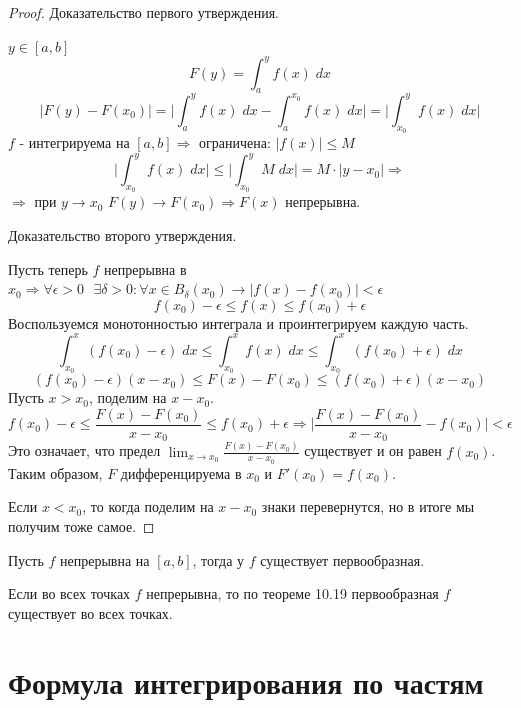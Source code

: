     \begin{proof}
    	Доказательство первого утверждения.
    	
    	$y \in [a, b]$    	
    	\[ F(y) = \int_a^y f(x) \; dx \]
    	\[ |F(y) - F(x_0)| = \bigg| \int_a^y f(x) \; dx - \int_a^{x_0} f(x) \; dx \bigg| =  \bigg| \int_{x_0}^y f(x) \; dx \bigg| \]
    	$f$ - интегрируема на $[a, b] \Rightarrow$ ограничена: $|f(x)| \leqslant M$
    	\[  \bigg| \int_{x_0}^y f(x) \; dx  \bigg| \leqslant  \bigg| \int_{x_0}^y M \; dx  \bigg| = M \cdot |y - x_0| \Rightarrow \]
    	$\Rightarrow$ при $y \to x_0$ $F(y) \to F(x_0) \Rightarrow F(x)$ непрерывна.
    	
    	Доказательство второго утверждения.
    	
    	Пусть теперь $f$ непрерывна в $x_0 \Rightarrow \forall \epsilon > 0 \text{ } \exists \delta > 0: \forall x \in B_{\delta}(x_0) \rightarrow |f(x) - f(x_0)| < \epsilon$
    	\[ f(x_0) - \epsilon \leqslant f(x) \leqslant f(x_0) + \epsilon \]
    	Воспользуемся монотонностью интеграла и проинтегрируем каждую часть.
    	\[ \int_{x_0}^x (f(x_0) - \epsilon) \; dx \leqslant \int_{x_0}^x f(x) \; dx \leqslant \int_{x_0}^x (f(x_0) + \epsilon) \; dx \]
    	\[ (f(x_0) - \epsilon)(x - x_0) \leqslant F(x) - F(x_0) \leqslant (f(x_0) + \epsilon)(x - x_0) \]
    	Пусть $x > x_0$, поделим на $x - x_0$.
    	\[ f(x_0) - \epsilon \leqslant \frac{F(x) - F(x_0)}{x - x_0} \leqslant f(x_0) + \epsilon \Rightarrow \bigg| \frac{F(x) - F(x_0)}{x - x_0} - f(x_0) \bigg| < \epsilon \]
    	Это означает, что предел $\lim_{x \to x_0} \frac{F(x) - F(x_0)}{x - x_0}$ существует и он равен $f(x_0)$. Таким образом, $F$ дифференцируема в $x_0$ и $F'(x_0) = f(x_0)$.
    	
    	Если $x < x_0$, то когда поделим на $x - x_0$ знаки перевернутся, но в итоге мы получим тоже самое.
    \end{proof}
    
    \begin{corollary}
    	Пусть $f$ непрерывна на $[a, b]$, тогда у $f$ существует первообразная.
    \end{corollary}
    
    \begin{explanation}
    	Если во всех точках $f$ непрерывна, то по теореме 10.19 первообразная $f$ существует во всех точках.
    \end{explanation}
    
    \section{Формула интегрирования по частям}
    
